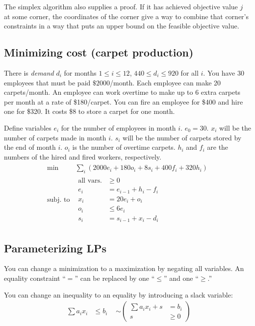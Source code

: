 The simplex algorithm also supplies a proof.
If it has achieved objective value \(j\) at some corner,
the coordinates of the corner give a way to combine that corner's
constraints in a way that puts an upper bound on the feasible objective value.

\subsection{Minimizing cost (carpet production)}
There is \emph{demand} \(d_i\) for months \(1\leq i \leq 12\), \(440\leq d_i \leq 920\) for all \(i\).
You have 30 employees that must be paid \(\$2000\)/month.
Each employee can make 20 carpets/month.
An employee can work overtime to make up to 6 extra carpets
per month at a rate of \$180/carpet.
You can fire an employee for \$400 and hire one for \$320.
It costs \$8 to store a carpet for one month.

Define variables \(e_i\) for the number of employees in month \(i\). \(e_0 = 30\). \(x_i\) will be the
number of carpets made in month \(i\). \(s_i\) will be the number of carpets stored by the end of month \(i\).
\(o_i\) is the number of overtime carpets.
\(h_i\) and \(f_i\) are the numbers of the hired and fired workers, respectively.
\begin{align}
	\begin{matrix}
		\min & \sum_i \left(2000 e_i + 180 o_i + 8s_i + 400 f_i + 320 h_i\right) \\
		\text{subj.~to} & \begin{aligned}
		\text{all vars.} &\geq 0 \\
		e_i &= e_{i -1} + h_i - f_i \\
		x_i &= 20e_i + o_i \\
		o_i &\leq 6e_i \\
		s_i &= s_{i - 1} + x_i - d_i
		\end{aligned}
	\end{matrix}
\end{align}

\subsection{Parameterizing LPs}
You can change a minimization to a maximization by negating all variables.
An equality constraint ``\(=\)'' can be replaced by one ``\(\leq\)'' and one ``\(\geq\).''

You can change an inequality to an equality by introducing a slack variable:
\begin{align}
\begin{aligned}
	\sum a_i x_i &\leq b_i
\end{aligned}
&\sim
\left(\begin{aligned}
	\sum a_i x_i + s &= b_i \\
	s &\geq 0
\end{aligned}\right)
\end{align}
